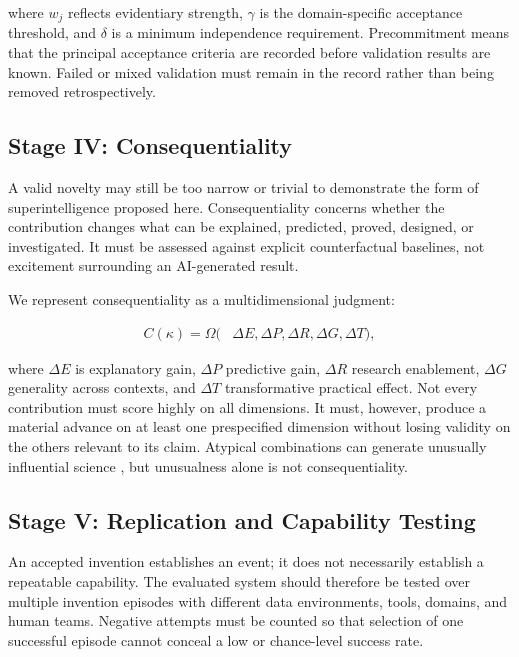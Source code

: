 where $w_j$ reflects evidentiary strength, $\gamma$ is the domain-specific
acceptance threshold, and $\delta$ is a minimum independence requirement.
Precommitment means that the principal acceptance criteria are recorded before
validation results are known. Failed or mixed validation must remain in the
record rather than being removed retrospectively.

\subsection{\textbf{Stage IV: Consequentiality}}

A valid novelty may still be too narrow or trivial to demonstrate the form of
superintelligence proposed here. Consequentiality concerns whether the
contribution changes what can be explained, predicted, proved, designed, or
investigated. It must be assessed against explicit counterfactual baselines,
not excitement surrounding an AI-generated result.

We represent consequentiality as a multidimensional judgment:

\begin{equation}
\begin{aligned}
C(\kappa)=\Omega(&\Delta E,\Delta P,\Delta R,
\Delta G,\Delta T),
\end{aligned}
\label{eq:consequentiality_vector}
\end{equation}

where $\Delta E$ is explanatory gain, $\Delta P$ predictive gain, $\Delta R$
research enablement, $\Delta G$ generality across contexts, and $\Delta T$
transformative practical effect. Not every contribution must score highly on
all dimensions. It must, however, produce a material advance on at least one
prespecified dimension without losing validity on the others relevant to its
claim. Atypical combinations can generate unusually influential science
\cite{uzzi2013atypical}, but unusualness alone is not consequentiality.

\subsection{\textbf{Stage V: Replication and Capability Testing}}

An accepted invention establishes an event; it does not necessarily establish
a repeatable capability. The evaluated system should therefore be tested over
multiple invention episodes with different data environments, tools, domains,
and human teams. Negative attempts must be counted so that selection of one
successful episode cannot conceal a low or chance-level success rate.

